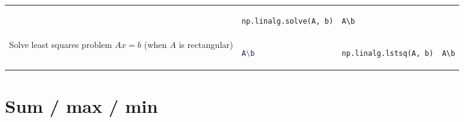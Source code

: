 \documentclass[10pt, landscape]{article}
\begin{document}
\begin{multicols}{2}
\begin{tabular}[]{@{}llll@{}}
\begin{minipage}[t]{0.22\columnwidth}
\end{minipage} & \begin{minipage}[t]{0.23\columnwidth}\raggedright
\begin{lstlisting}[language=Python]
np.linalg.solve(A, b)
\end{lstlisting}

\end{minipage} & \begin{minipage}[t]{0.20\columnwidth}\raggedright
\begin{lstlisting}
A\b
\end{lstlisting}

\end{minipage}\tabularnewline
\begin{minipage}[t]{0.23\columnwidth}\raggedright
Solve least squares problem \(Ax=b\) (when \(A\) is rectangular)
\end{minipage} & \begin{minipage}[t]{0.22\columnwidth}\raggedright
\begin{lstlisting}[language=Matlab]
A\b
\end{lstlisting}

\end{minipage} & \begin{minipage}[t]{0.23\columnwidth}\raggedright
\begin{lstlisting}[language=Python]
np.linalg.lstsq(A, b)
\end{lstlisting}

\end{minipage} & \begin{minipage}[t]{0.20\columnwidth}\raggedright
\begin{lstlisting}
A\b
\end{lstlisting}

\end{minipage}\tabularnewline
\bottomrule
\end{tabular}

\section{Sum / max / min}\label{sum-max-min}


\end{multicols}
\end{document}
